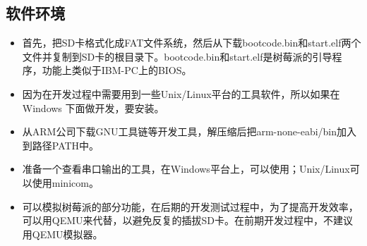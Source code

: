 \documentclass[main.tex]{subfiles}
\begin{document}
\begin{CJK*}{UTF8}{song}
\subsection{软件环境}
\begin{itemize}
\item 首先，把SD卡格式化成FAT文件系统，然后从下载bootcode.bin和start.elf两个文件并复制到SD卡的根目录下。bootcode.bin和start.elf是树莓派的引导程序，功能上类似于IBM-PC上的BIOS。
\item 因为在开发过程中需要用到一些Unix/Linux平台的工具软件，所以如果在 Windows 下面做开发，要安装。
\item 从ARM公司下载GNU工具链等开发工具，解压缩后把arm-none-eabi/bin加入到路径PATH中。
\item 准备一个查看串口输出的工具，在Windows平台上，可以使用；Unix/Linux可以使用minicom。
\item {}可以模拟树莓派的部分功能，在后期的开发测试过程中，为了提高开发效率，可以用QEMU来代替，以避免反复的插拔SD卡。在前期开发过程中，不建议用QEMU模拟器。
\end{itemize}

\clearpage
\ifxetex\else\end{CJK*}\fi
\end{document}
